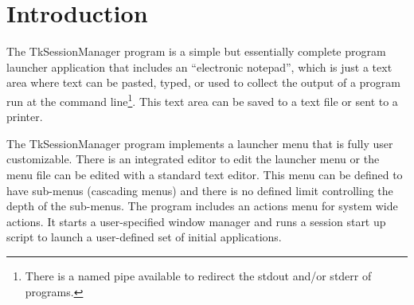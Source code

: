 \chapter{Introduction}
\label{chpt:Introduction}

The TkSessionManager program is a simple but essentially complete
program launcher application that includes an ``electronic notepad'',
which is just a text area where text can be pasted, typed, or used to
collect the output of a program run at the command line\footnote{There
is a named pipe available to redirect the stdout and/or stderr of
programs.}. This text area can be saved to a text file or sent to a
printer.

The TkSessionManager program implements a launcher menu that is fully
user customizable. There is an integrated editor to edit the launcher
menu or the menu file can be edited with a standard text editor. This
menu can be defined to have sub-menus (cascading menus) and there is no
defined limit controlling the depth of the sub-menus. The program
includes an actions menu for system wide actions. It starts a
user-specified window manager and runs a session start up script to
launch a user-defined set of initial applications.

